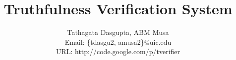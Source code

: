\documentclass[12pt]{article}
\begin{document}
\title{Truthfulness Verification System}

\author{
Tathagata Dasgupta, ABM Musa\\
Email: \{tdasgu2, amusa2\}@uic.edu\\
URL: http://code.google.com/p/tverifier }

\date{}
\maketitle


%
%
%
%
\end{document}
